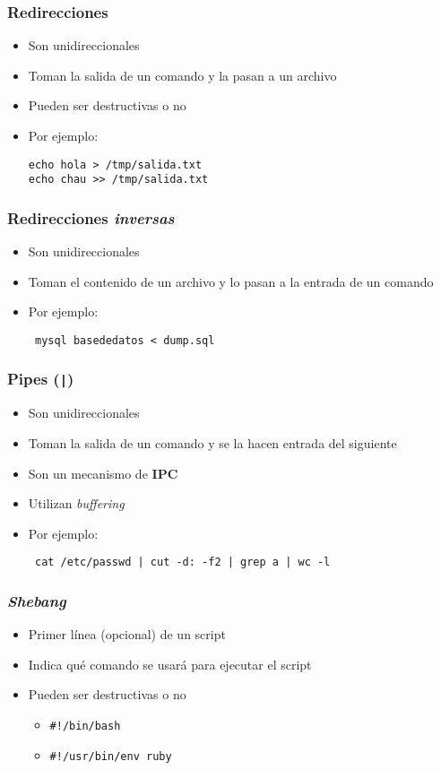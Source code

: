 \begin{frame}[fragile]
  \frametitle{Redirecciones}
  \begin{itemize}
    \item Son unidireccionales
    \item Toman la salida de un comando y la pasan a un archivo
    \item Pueden ser destructivas o no
    \item Por ejemplo:
   \begin{lstlisting}
echo hola > /tmp/salida.txt
echo chau >> /tmp/salida.txt
   \end{lstlisting}
  \end{itemize}
\end{frame}

\begin{frame}[fragile]
  \frametitle{Redirecciones \textit{inversas}}
  \begin{itemize}
    \item Son unidireccionales
    \item Toman el contenido de un archivo y lo pasan a la entrada de un comando
    \item Por ejemplo:
   \begin{lstlisting}
 mysql basededatos < dump.sql
   \end{lstlisting}
  \end{itemize}
\end{frame}

\begin{frame}[fragile]
  \frametitle{Pipes (\texttt{|})}
  \begin{itemize}
    \item Son unidireccionales
    \item Toman la salida de un comando y se la hacen entrada del siguiente
    \item Son un mecanismo de \textbf{IPC}
    \item Utilizan \textit{buffering}
    \item Por ejemplo:
   \begin{lstlisting}
 cat /etc/passwd | cut -d: -f2 | grep a | wc -l
   \end{lstlisting}
  \end{itemize}
\end{frame}

\begin{frame}
  \frametitle{\textit{Shebang}}
  \begin{itemize}
    \item Primer línea (opcional) de un script
    \item Indica qué comando se usará para ejecutar el script
    \item Pueden ser destructivas o no
    \begin{itemize}
      \item \texttt{\#!/bin/bash}
      \item \texttt{\#!/usr/bin/env ruby}
    \end{itemize}
  \end{itemize}
\end{frame}

